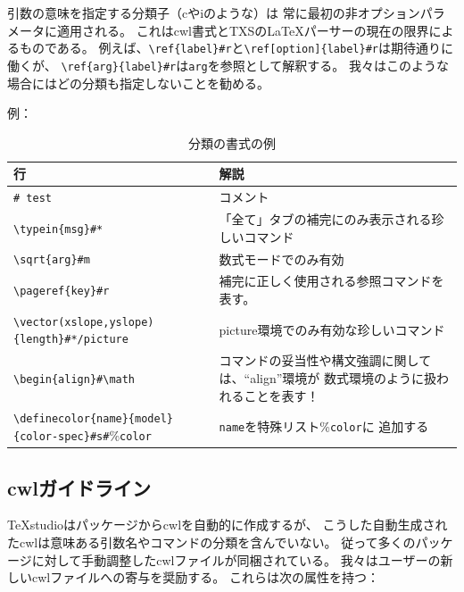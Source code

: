 引数の意味を指定する分類子（cやiのような）は
常に最初の非オプションパラメータに適用される。
これはcwl書式とTXSのLaTeXパーサーの現在の限界によるものである。
例えば、\verb+\ref{label}#r+と\verb+\ref[option]{label}#r+は期待通りに働くが、
\verb+\ref{arg}{label}#r+は\verb+arg+を参照として解釈する。
我々はこのような場合にはどの分類も指定しないことを勧める。

例：

\begin{table}[H]
  \centering
  \caption{分類の書式の例}
  \begin{tabularx}{\linewidth}{lX}
    \hline
    \textbf{行} & \textbf{解説}\\
    \hline
    \verb+# test+ & コメント\\
    \verb+\typein+\verb+{msg}#*+ & 「全て」タブの補完にのみ表示される珍しいコマンド\\
    \verb+\sqrt+\verb+{arg}#m+ & 数式モードでのみ有効\\
    \verb+\pageref+\verb+{key}#r+ & 補完に正しく使用される参照コマンドを表す。\\
    \verb+\vector+\verb+(xslope,yslope){length}#*/picture+
      & picture環境でのみ有効な珍しいコマンド\\
    \verb+\begin+\verb+{align}#\math+
      & コマンドの妥当性や構文強調に関しては、``align''環境が
      数式環境のように扱われることを表す！\\
    \verb+\definecolor+\verb+{name}{model}{color-spec}#s#+\%\verb+color+
      & \verb+name+を特殊リスト\%\verb+color+に
      追加する\\
    \hline
  \end{tabularx}
\end{table}

\subsection{cwlガイドライン}

TeXstudioはパッケージからcwlを自動的に作成するが、
こうした自動生成されたcwlは意味ある引数名やコマンドの分類を含んでいない。
従って多くのパッケージに対して手動調整したcwlファイルが同梱されている。
我々はユーザーの新しいcwlファイルへの寄与を奨励する。
これらは次の属性を持つ：


